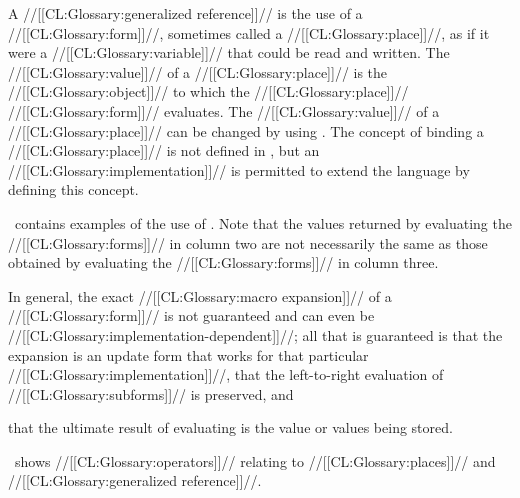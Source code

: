 


A //[[CL:Glossary:generalized reference]]// is the use of a //[[CL:Glossary:form]]//, sometimes called a //[[CL:Glossary:place]]//, as if it were a //[[CL:Glossary:variable]]// that could be read and written. The //[[CL:Glossary:value]]// of a //[[CL:Glossary:place]]// is  the //[[CL:Glossary:object]]// to which the //[[CL:Glossary:place]]// //[[CL:Glossary:form]]// evaluates. The //[[CL:Glossary:value]]// of a //[[CL:Glossary:place]]// can be changed by using . The concept of binding a //[[CL:Glossary:place]]// is not defined in \clisp, but an //[[CL:Glossary:implementation]]// is permitted to extend the language by defining this concept.

\Thenextfigure\ contains examples of the use of . Note that the values returned by evaluating the //[[CL:Glossary:forms]]// in column two  are not necessarily the same as those obtained by evaluating the  //[[CL:Glossary:forms]]// in column three.

In general, the exact //[[CL:Glossary:macro expansion]]// of a  //[[CL:Glossary:form]]// is not guaranteed  and can even be //[[CL:Glossary:implementation-dependent]]//; all that is guaranteed is 
 that the expansion is an update form that works
   for that particular //[[CL:Glossary:implementation]]//,
 that the left-to-right evaluation of //[[CL:Glossary:subforms]]// is preserved,  and

 that the ultimate result of evaluating  is the value
  or values being stored.


\Thenextfigure\ shows //[[CL:Glossary:operators]]// relating to //[[CL:Glossary:places]]// and //[[CL:Glossary:generalized reference]]//.




